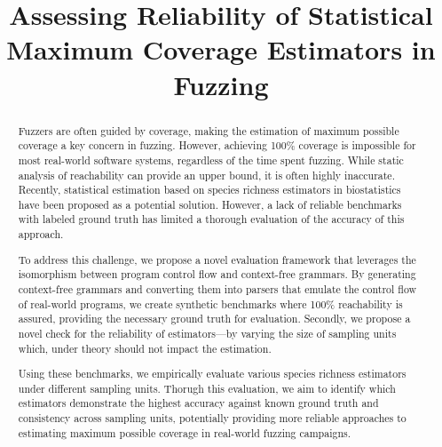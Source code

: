 \documentclass[conference]{IEEEtran}
\newcommand{\mytitle}{Assessing Reliability of Statistical Maximum Coverage Estimators in Fuzzing}
\begin{document}
\title{\mytitle}

\author{
\and 
{}
}

\maketitle

\thispagestyle{plain}
\pagestyle{plain} 


\begin{abstract}
Fuzzers are often guided by coverage, making the estimation of maximum
possible coverage a key concern in fuzzing.
However, achieving 100\% coverage is impossible for most real-world
software systems, regardless of the time spent fuzzing.
While static analysis of reachability can provide an upper bound,
it is often highly inaccurate.
Recently, statistical estimation based on species richness estimators
in biostatistics have been proposed as a potential solution.
However, a lack of reliable benchmarks with labeled ground truth has
limited a thorough evaluation of the accuracy of this approach.

To address this challenge, we propose a novel evaluation framework
that leverages the isomorphism between program control flow and context-free grammars.
By generating context-free grammars and converting them into parsers that
emulate the control flow of real-world programs,
we create synthetic benchmarks where 100\% reachability is assured,
providing the necessary ground truth for evaluation.
Secondly, we propose a novel check for the reliability of estimators---by
varying the size of sampling units which, under theory should not impact
the estimation.

Using these benchmarks, we empirically evaluate various species richness
estimators under different sampling units. Thorugh this evaluation, we aim to
identify which estimators demonstrate the highest accuracy against known
ground truth and consistency across sampling units,
potentially providing more reliable approaches to estimating maximum possible
coverage in real-world fuzzing campaigns.
\end{abstract}
\end{document}
